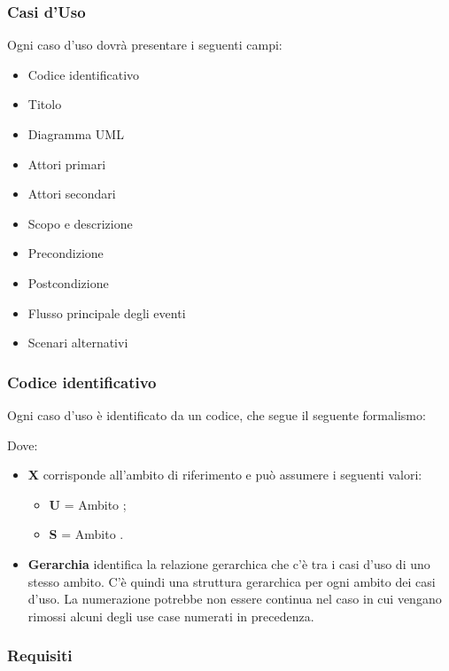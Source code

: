 \subsubsection{Casi d'Uso}

Ogni caso d'uso dovrà presentare i seguenti campi:
\begin{itemize}
 \item Codice identificativo
 \item Titolo
 \item Diagramma UML
 \item Attori primari
 \item Attori secondari 
 \item Scopo e descrizione
 \item Precondizione
 \item Postcondizione
 \item Flusso principale degli eventi
 \item Scenari alternativi
\end{itemize}

\subsubsection{Codice identificativo}

Ogni caso d'uso è identificato da un codice, che segue il seguente formalismo:
\begin{center}
\end{center}

Dove:
\begin{itemize}
 \item \textbf{X} corrisponde all'ambito di riferimento e può assumere i seguenti valori:
    \begin{itemize}
     \item[] \textbf{U} = Ambito ;
     \item[] \textbf{S} = Ambito .
    \end{itemize}

     \item \textbf{Gerarchia} identifica la relazione gerarchica che c'è tra i casi d'uso di uno stesso ambito. C'è quindi una struttura gerarchica per ogni ambito dei casi d'uso. La numerazione potrebbe non essere continua nel caso in cui vengano rimossi alcuni degli use case numerati in precedenza.
\end{itemize}

\subsubsection{Requisiti}

